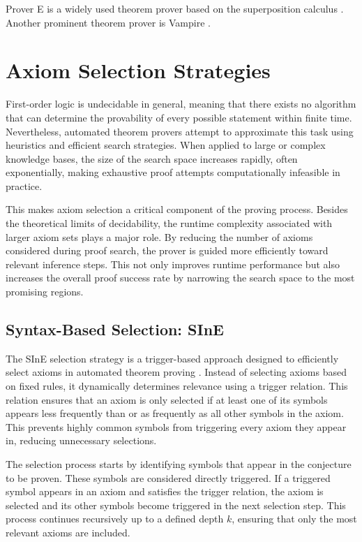 \documentclass[english,version-2020-11]{uzl-thesis}
\begin{document}
Prover E is a widely used theorem prover based on the superposition calculus \cite{Schulz2019}. Another prominent theorem prover is Vampire \cite{Riazanov2002}.

\section{Axiom Selection Strategies}
First-order logic is undecidable in general, meaning that there exists no algorithm that can determine the provability of every possible statement within finite time. Nevertheless, automated theorem provers attempt to approximate this task using heuristics and efficient search strategies. When applied to large or complex knowledge bases, the size of the search space increases rapidly, often exponentially, making exhaustive proof attempts computationally infeasible in practice.

This makes axiom selection a critical component of the proving process. Besides the theoretical limits of decidability, the runtime complexity associated with larger axiom sets plays a major role. By reducing the number of axioms considered during proof search, the prover is guided more efficiently toward relevant inference steps. This not only improves runtime performance but also increases the overall proof success rate by narrowing the search space to the most promising regions.

\subsection{Syntax-Based Selection: SInE}

The SInE selection strategy is a trigger-based approach designed to efficiently select axioms in automated theorem proving \cite{Hoder2011}. Instead of selecting axioms based on fixed rules, it dynamically determines relevance using a trigger relation. This relation ensures that an axiom is only selected if at least one of its symbols appears less frequently than or as frequently as all other symbols in the axiom. This prevents highly common symbols from triggering every axiom they appear in, reducing unnecessary selections.

The selection process starts by identifying symbols that appear in the conjecture to be proven. These symbols are considered directly triggered. If a triggered symbol appears in an axiom and satisfies the trigger relation, the axiom is selected and its other symbols become triggered in the next selection step. This process continues recursively up to a defined depth \( k \), ensuring that only the most relevant axioms are included.
\end{document}
